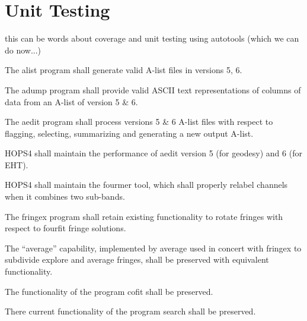 %
%
\section{Unit Testing}
\label{sec:unit}

this can be words about coverage and unit testing using autotools
(which we can do now...)

 The \acs{alist} program shall generate valid \acs{A-list} files in 
versions 5, 6. 

 The \acs{adump} program shall provide valid ASCII text representations 
of columns of data from an \acs{A-list} of version 5 \& 6.

 The \acs{aedit} program shall process versions 5 \& 6 \acs{A-list} 
files with respect to flagging, selecting, summarizing and generating a new 
output \acs{A-list}.

 HOPS4 shall maintain the performance of \acs{aedit} version 5 (for 
geodesy) and 6 (for EHT).

 HOPS4 shall maintain the \acs{fourmer} tool, which shall properly 
relabel channels when it combines two sub-bands.

 The \acs{fringex} program shall retain existing functionality to rotate
fringes with respect to fourfit fringe solutions.

 The ``average'' capability, implemented by \acs{average} used in 
concert with \acs{fringex} to subdivide explore and average fringes, shall be 
preserved with equivalent functionality.

 The functionality of the program \acs{cofit} shall be preserved.

 There current functionality of the program \acs{search} shall be 
preserved.

